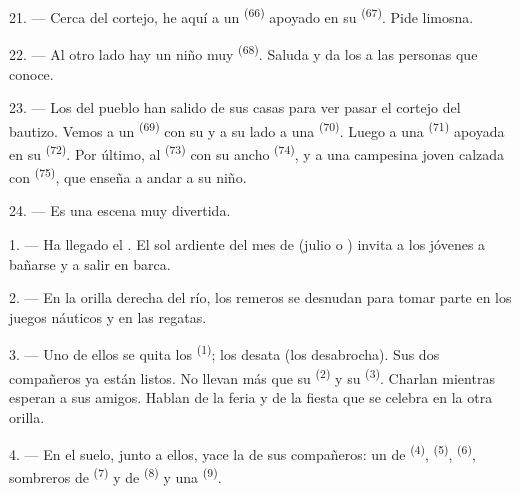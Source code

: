 \VUsaut{4.6mm}
\VUsaut{3.4mm}

21. --- Cerca del cortejo, he aquí a un  \textsuperscript{(66)}
apoyado en su  \textsuperscript{(67)}. Pide limosna.

22. --- Al otro lado hay un niño muy  \textsuperscript{(68)}. Saluda y
da los  a las personas que conoce.

23. --- Los del pueblo han salido de sus casas para ver pasar el cortejo
del bautizo. Vemos a un  \textsuperscript{(69)} con su
 y a su lado a una 
\textsuperscript{(70)}. Luego a una  \textsuperscript{(71)} apoyada en su
 \textsuperscript{(72)}. Por último, al 
\textsuperscript{(73)} con su ancho  \textsuperscript{(74)}, y a
una campesina joven calzada con  \textsuperscript{(75)}, que enseña a
andar a su niño.

24. --- Es una escena muy divertida.
\VUsaut{4.0mm}

\VUsaut{3.0mm}

\VUsaut{2.4mm}

\VUsaut{3.0mm}

1. --- Ha llegado el . El sol ardiente del mes de
 (julio o ) invita a los jóvenes a bañarse y a
salir en barca.

2. --- En la orilla derecha del río, los remeros se desnudan para tomar
parte en los juegos náuticos y en las regatas.

3. --- Uno de ellos se quita los  \textsuperscript{(1)}; los
desata (los desabrocha). Sus dos compañeros ya están listos. No llevan
más que su  \textsuperscript{(2)} y su 
\textsuperscript{(3)}. Charlan mientras esperan a sus amigos. Hablan de la feria y
de la fiesta que se celebra en la otra orilla.

4. --- En el suelo, junto a ellos, yace la  de sus compañeros:
un  de  \textsuperscript{(4)}, 
\textsuperscript{(5)},  \textsuperscript{(6)}, sombreros de
 \textsuperscript{(7)} y de  \textsuperscript{(8)} y una
 \textsuperscript{(9)}.


